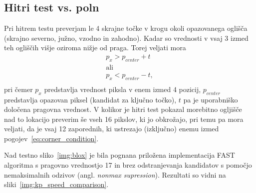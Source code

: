 \documentclass[a4paper,11pt]{article}
\begin{document}
\subsection{Hitri test vs. poln}
Pri hitrem testu preverjam le 4 skrajne točke v krogu okoli opazovanega oglišča (skrajno severno, južno, vzodno in zahodno). Kadar so vrednosti v vsaj 3 izmed teh ogliščih višje oziroma nižje od praga. Torej veljati mora
\begin{equation}
\begin{gathered}
	p_x > p_{center} + t \\
	\text{ali} \\
	p_x < p_{center} - t, \\
\end{gathered}
\label{eq:corner_condition}
\end{equation}
pri čemer $p_x$ predstavlja vrednost piksla v enem izmed 4 pozicij, $p_{center}$ predstavlja opazovan piksel (kandidat za ključno točko), $t$ pa je uporabniško določena pragovna vrednost.
V kolikor je hitri test pokazal morebitno ogljišče nad to lokacijo preverim še vseh 16 pikslov, ki jo obkrožajo, pri temu pa mora veljati, da je vsaj 12 zaporednih, ki ustrezajo (izključno) enemu izmed pogojev~\ref{eq:corner_condition}.

Nad testno sliko~\ref{img:blox} je bila pognana priložena implementacija FAST algoritma s pragovno vrednostjo 17 in brez odstranjevanja kandidatov s pomočjo nemaksimalnih odzivov (angl. \textit{nonmax supression}). Rezultati so vidni na sliki~\ref{img:kp_speed_comparison}.
\end{document}
